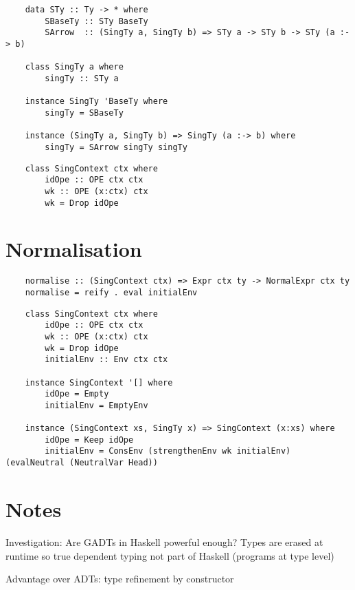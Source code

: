 
\begin{lstlisting}
    data STy :: Ty -> * where
        SBaseTy :: STy BaseTy
        SArrow  :: (SingTy a, SingTy b) => STy a -> STy b -> STy (a :-> b)

    class SingTy a where
        singTy :: STy a 

    instance SingTy 'BaseTy where
        singTy = SBaseTy

    instance (SingTy a, SingTy b) => SingTy (a :-> b) where
        singTy = SArrow singTy singTy
\end{lstlisting}

\begin{lstlisting}
    class SingContext ctx where
        idOpe :: OPE ctx ctx
        wk :: OPE (x:ctx) ctx
        wk = Drop idOpe
\end{lstlisting}

\section{Normalisation}

\begin{lstlisting}
    normalise :: (SingContext ctx) => Expr ctx ty -> NormalExpr ctx ty
    normalise = reify . eval initialEnv
\end{lstlisting}

\begin{lstlisting}
    class SingContext ctx where
        idOpe :: OPE ctx ctx
        wk :: OPE (x:ctx) ctx
        wk = Drop idOpe
        initialEnv :: Env ctx ctx

    instance SingContext '[] where
        idOpe = Empty
        initialEnv = EmptyEnv

    instance (SingContext xs, SingTy x) => SingContext (x:xs) where
        idOpe = Keep idOpe
        initialEnv = ConsEnv (strengthenEnv wk initialEnv) (evalNeutral (NeutralVar Head))
\end{lstlisting}

\section{Notes}

Investigation: Are GADTs in Haskell powerful enough? Types are erased at runtime so true dependent typing not part of Haskell (programs at type level)

Advantage over ADTs: type refinement by constructor

